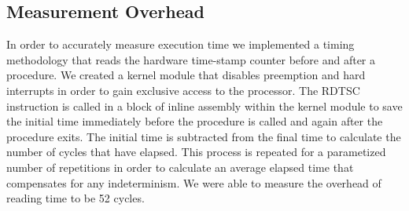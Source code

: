 \subsection{Measurement Overhead}

In order to accurately measure execution time we implemented a timing methodology that reads the 
hardware time-stamp counter before and after a procedure. We created a kernel module that disables 
preemption and hard interrupts in order to gain exclusive access to the processor. The RDTSC 
instruction is called in a block of inline assembly within the kernel module to save the 
initial time immediately before the procedure is called and again after the procedure exits. The initial time is subtracted from the final time to calculate the number of cycles that have elapsed. This process
is repeated for a parametized number of repetitions in order to calculate an average elapsed time that 
compensates for any indeterminism. We were able to measure the overhead of reading time to be 52 cycles. 
